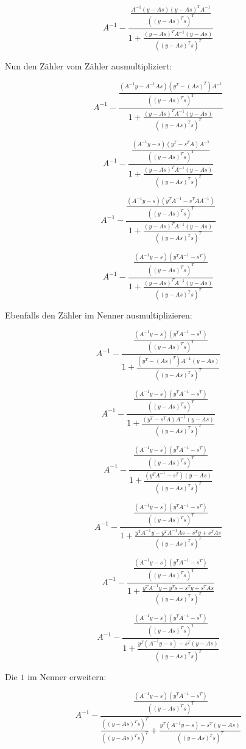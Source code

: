 \documentclass[a4paper, 12pt]{report}
\begin{document}
$$ A^{-1} - \frac{ \frac{A^{-1}(y-As)(y-As)^TA^{-1}}{\left( (y-As)^Ts\right)^T } }{1 + \frac{(y-As)^TA^{-1}(y-As)}{\left( (y-As)^Ts\right)^T}}$$

Nun den Zähler vom Zähler ausmultipliziert:

$$ A^{-1} - \frac{ \frac{ (A^{-1}y - A^{-1}As)(y^T-(As)^T)A^{-1} }{\left( (y-As)^Ts\right)^T } }{1 + \frac{(y-As)^TA^{-1}(y-As)}{\left( (y-As)^Ts\right)^T}}$$

$$ A^{-1} - \frac{ \frac{ (A^{-1}y - s)(y^T - s^TA)A^{-1} }{\left( (y-As)^Ts\right)^T } }{1 + \frac{(y-As)^TA^{-1}(y-As)}{\left( (y-As)^Ts\right)^T}}$$

$$ A^{-1} - \frac{ \frac{ (A^{-1}y - s)(y^TA^{-1} - s^TAA^{-1}) }{\left( (y-As)^Ts\right)^T } }{1 + \frac{(y-As)^TA^{-1}(y-As)}{\left( (y-As)^Ts\right)^T}}$$

$$ A^{-1} - \frac{ \frac{ (A^{-1}y-s)(y^TA^{-1}-s^T) }{\left( (y-As)^Ts\right)^T } }{1 + \frac{(y-As)^TA^{-1}(y-As)}{\left( (y-As)^Ts\right)^T}}$$

Ebenfalls den Zähler im Nenner ausmultiplizieren:

$$ A^{-1} - \frac{ \frac{ (A^{-1}y-s)(y^TA^{-1}-s^T) }{\left( (y-As)^Ts\right)^T } }{1 + \frac{ (y^T - (As)^T)A^{-1}(y - As) }{\left( (y-As)^Ts\right)^T}}$$

$$ A^{-1} - \frac{ \frac{ (A^{-1}y-s)(y^TA^{-1}-s^T) }{\left( (y-As)^Ts\right)^T } }{1 + \frac{ (y^T - s^TA)A^{-1}(y-As) }{\left( (y-As)^Ts\right)^T}}$$

$$ A^{-1} - \frac{ \frac{ (A^{-1}y-s)(y^TA^{-1}-s^T) }{\left( (y-As)^Ts\right)^T } }{1 + \frac{ (y^TA^{-1} - s^T)(y - As) }{\left( (y-As)^Ts\right)^T}}$$

$$ A^{-1} - \frac{ \frac{ (A^{-1}y-s)(y^TA^{-1}-s^T) }{\left( (y-As)^Ts\right)^T } }{1 + \frac{ y^TA^{-1}y - y^TA^{-1}As - s^Ty + s^TAs }{\left( (y-As)^Ts\right)^T}}$$

$$ A^{-1} - \frac{ \frac{ (A^{-1}y-s)(y^TA^{-1}-s^T) }{\left( (y-As)^Ts\right)^T } }{1 + \frac{ y^TA^{-1}y - y^Ts - s^Ty + s^TAs }{\left( (y-As)^Ts\right)^T}}$$

$$ A^{-1} - \frac{ \frac{ (A^{-1}y-s)(y^TA^{-1}-s^T) }{\left( (y-As)^Ts\right)^T } }{1 + \frac{ y^T(A^{-1}y - s) - s^T(y - As) }{\left( (y-As)^Ts\right)^T}}$$

Die $1$ im Nenner erweitern:

$$ A^{-1} - \frac{ \frac{ (A^{-1}y-s)(y^TA^{-1}-s^T) }{\left( (y-As)^Ts\right)^T } }{ \frac{\left( (y-As)^Ts\right)^T}{\left( (y-As)^Ts\right)^T} + \frac{ y^T(A^{-1}y - s) - s^T(y - As) }{\left( (y-As)^Ts\right)^T}}$$
\end{document}
